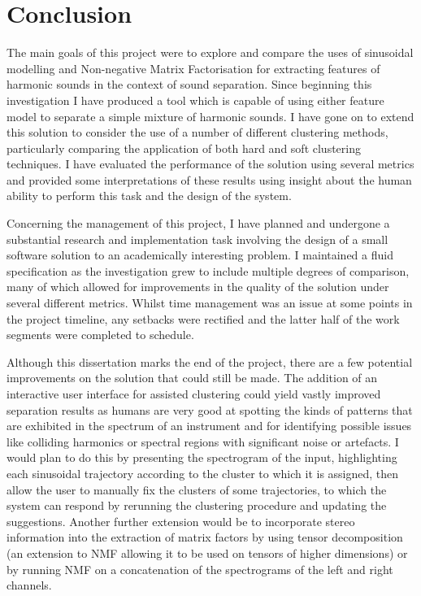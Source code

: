 \documentclass[10pt,twoside,a4paper]{report}
\begin{document}

\chapter{Conclusion}


The main goals of this project were to explore and compare the uses of sinusoidal modelling and Non-negative Matrix Factorisation for extracting features of harmonic sounds in the context of sound separation. Since beginning this investigation I have produced a tool which is capable of using either feature model to separate a simple mixture of harmonic sounds. I have gone on to extend this solution to consider the use of a number of different clustering methods, particularly comparing the application of both hard and soft clustering techniques. I have evaluated the performance of the solution using several metrics and provided some interpretations of these results using insight about the human ability to perform this task and the design of the system.



Concerning the management of this project, I have planned and undergone a substantial research and implementation task involving the design of a small software solution to an academically interesting problem. I maintained a fluid specification as the investigation grew to include multiple degrees of comparison, many of which allowed for improvements in the quality of the solution under several different metrics. Whilst time management was an issue at some points in the project timeline, any setbacks were rectified and the latter half of the work segments were completed to schedule.


Although this dissertation marks the end of the project, there are a few potential improvements on the solution that could still be made. The addition of an interactive user interface for assisted clustering could yield vastly improved separation results as humans are very good at spotting the kinds of patterns that are exhibited in the spectrum of an instrument and for identifying possible issues like colliding harmonics or spectral regions with significant noise or artefacts. I would plan to do this by presenting the spectrogram of the input, highlighting each sinusoidal trajectory according to the cluster to which it is assigned, then allow the user to manually fix the clusters of some trajectories, to which the system can respond by rerunning the clustering procedure and updating the suggestions. Another further extension would be to incorporate stereo information into the extraction of matrix factors by using tensor decomposition (an extension to NMF allowing it to be used on tensors of higher dimensions) or by running NMF on a concatenation of the spectrograms of the left and right channels.
\end{document}
